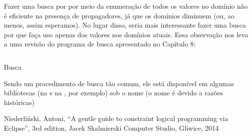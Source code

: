 Fazer uma busca por  por meio da enumeração de todos os valores no domínio
não é eficiente na presença de propagadores, já que os domínios diminuem (ou, ao menos, assim
esperamos). No lugar disso, seria mais interessante fazer uma busca por \backtracking que faça uso
apenas dos valores nos domínios atuais. Essa observação nos leva a uma revisão do programa de busca
apresentado no Capítulo 8: %

    \begin{listing}[!h]
\inputminted{prolog}{../Exemplos/Cap10/prog4_busca.ecl}
\caption{Busca}
    \end{listing}

Sendo um procedimento de busca tão comum, ele está disponível em algumas bibliotecas \eclipse (na
 e na , por exemplo) sob o nome  (o nome
 é devido a razões históricas)



  \begin{thebibliography}{2}

    Niederliński, Antoni,
    ``A gentle guide to constraint logical programming via Eclipse'',
    3rd edition, Jacek Skalmierski Computer Studio, Gliwice, 2014

  \end{thebibliography}

%

